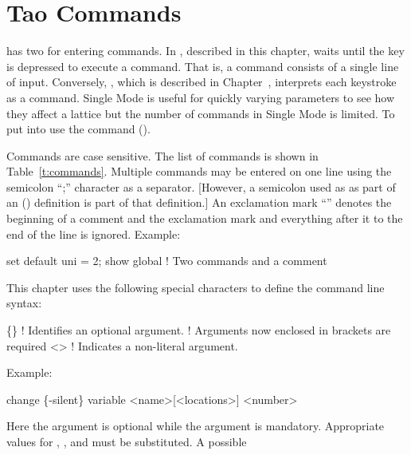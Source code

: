 \chapter{Tao Commands}
\label{c:command}

\tao has two  for entering commands. In , described in this
chapter, \tao waits until the  key is depressed to execute a command. That is,
a command consists of a single line of input. Conversely, , which is
described in Chapter~, interprets each keystroke as a command. Single Mode
is useful for quickly varying parameters to see how they affect a lattice but the number
of commands in Single Mode is limited. To put \tao into  use the
 command ().

Commands are case sensitive. The list of commands is shown in
Table~\ref{t:commands}. Multiple commands may be entered on one line using the semicolon
``;'' character as a separator.  [However, a semicolon used as as part of an 
() definition is part of that definition.]  An exclamation mark ``\vn{!}''
denotes the beginning of a comment and the exclamation mark and everything after it to the
end of the line is ignored.  Example:
\begin{example}
  set default uni = 2; show global  ! Two commands and a comment
\end{example}

This chapter uses the following special characters to define the command line syntax:
\begin{example}
  \{\}        ! Identifies an optional argument.
            !   Arguments now enclosed in brackets are required
  <>        ! Indicates a non-literal argument.
\end{example}

Example:
\begin{example}
  change \{-silent\} variable <name>[<locations>] <number>
\end{example}
Here the  argument is optional while the  argument is
mandatory. Appropriate values for , , and  must be
substituted. A possible



